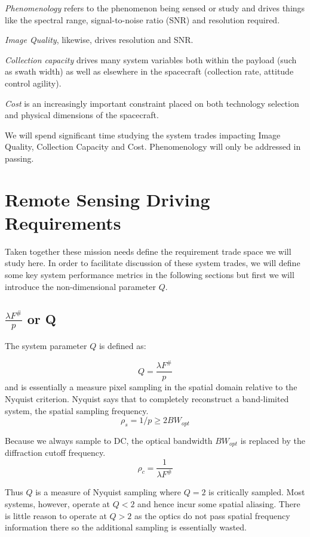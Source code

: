 \documentclass[10pt,journal]{IEEEtran}  %
\begin{document}
\emph{Phenomenology} refers to the phenomenon being sensed or study and drives things like the spectral range, signal-to-noise ratio (SNR) and resolution required.  

\emph{Image Quality}, likewise, drives resolution and SNR.  

\emph{Collection capacity} drives many system variables both within the payload (such as swath width) as well as elsewhere in the spacecraft (collection rate, attitude control agility).  

\emph{Cost} is an increasingly important constraint placed on both technology selection and physical dimensions of the spacecraft.

We will spend significant time studying the system trades impacting Image Quality, Collection Capacity and Cost.  Phenomenology will only be addressed in passing.

\section{Remote Sensing Driving Requirements}
\label{sec:requirements}

Taken together these mission needs define the requirement trade space we will study here.  In order to facilitate discussion of these system trades, we will define some key system performance metrics in the following sections but first we will introduce the non-dimensional parameter $Q$.

\subsection{$\frac{\lambda F^\#}{p}$ or Q}
\label{sec:q}

The system parameter $Q$ is defined as:

\begin{equation}
Q = \frac{\lambda F^\#}{p}
\label{eq:Q}
\end{equation}
and is essentially a measure pixel sampling in the spatial domain relative to the Nyquist criterion.  Nyquist says that to completely reconstruct a band-limited system, the spatial sampling frequency. 
$$\rho_s = 1/p \geq 2 BW_{opt}$$

Because we always sample to DC, the optical bandwidth $BW_{opt}$ is replaced by the diffraction cutoff frequency.
$$\rho_c = \frac{1}{\lambda F^\#}$$

Thus $Q$ is a measure of Nyquist sampling where $Q=2$ is critically sampled.  Most systems, however, operate at $Q < 2$ and hence incur some spatial aliasing.  There is little reason to operate at $Q > 2$ as the optics do not pass spatial frequency information there so the additional sampling is essentially wasted.
\end{document}
